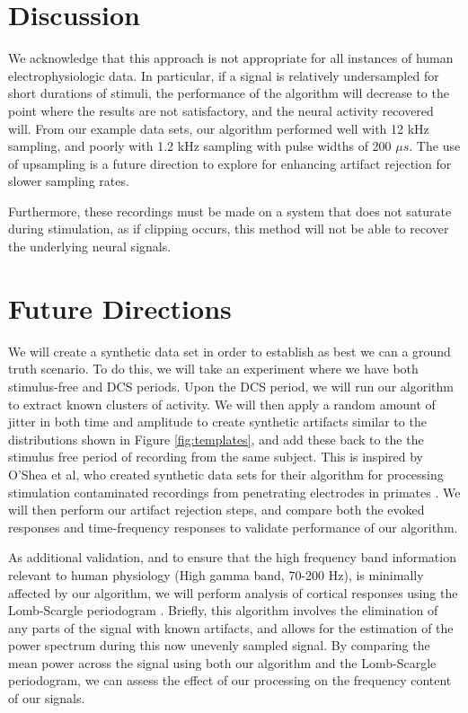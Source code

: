 \section{Discussion}

We acknowledge that this approach is not appropriate for all instances of human electrophysiologic data. In particular, if a signal is relatively undersampled for short durations of stimuli, the performance of the algorithm will decrease to the point where the results are not satisfactory, and the neural activity recovered will. From our example data sets, our algorithm performed well with 12 kHz sampling, and poorly with 1.2 kHz sampling with pulse widths of 200 $ \mu s $. The use of upsampling is a future direction to explore for enhancing artifact rejection for slower sampling rates. 

Furthermore, these recordings must be made on a system that does not saturate during stimulation, as if clipping occurs, this method will not be able to recover the underlying neural signals. 

\section{Future Directions}

We will create a synthetic data set in order to establish as best we can a ground truth scenario. To do this, we will take an experiment where we have both stimulus-free and DCS periods. Upon the DCS period, we will run our algorithm to extract known clusters of activity. We will then apply a random amount of jitter in both time and amplitude to create synthetic artifacts similar to the distributions shown in Figure \ref{fig:templates}, and add these back to the the stimulus free period of recording from the same subject. This is inspired by O’Shea et al, who created synthetic data sets for their algorithm for processing stimulation contaminated recordings from penetrating electrodes in primates \cite{OShea2017}. We will then perform our artifact rejection steps, and compare both the evoked responses and time-frequency responses to validate performance of our algorithm. 

As additional validation, and to ensure that the high frequency band information relevant to human physiology (High gamma band, 70-200 Hz), is minimally affected by our algorithm, we will perform analysis of cortical responses using the Lomb-Scargle periodogram \cite{Muller2017}. Briefly, this algorithm involves the elimination of any parts of the signal with known artifacts, and allows for the estimation of the power spectrum during this now unevenly sampled signal. By comparing the mean power across the signal using both our algorithm and the Lomb-Scargle periodogram, we can assess the effect of our processing on the frequency content of our signals. 

